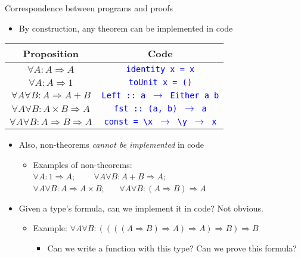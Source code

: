 \documentclass[english]{beamer}
\providecommand{\tabularnewline}{\\}
\begin{document}
\begin{frame}{Correspondence between programs and proofs}

\begin{itemize}
\item By construction, any theorem can be implemented in code
\end{itemize}
\begin{center}
\begin{tabular}{|c|c|}
\hline 
\textbf{Proposition} & \textbf{Code}\tabularnewline
\hline 
\hline 
$\forall A:A\Rightarrow A$ & \texttt{\textcolor{blue}{\footnotesize{}identity x = x}}\tabularnewline
\hline 
$\forall A:A\Rightarrow1$ & \texttt{\textcolor{blue}{\footnotesize{}toUnit x = ()}}\tabularnewline
\hline 
$\forall A\forall B:A\Rightarrow A+B$ & \texttt{\textcolor{blue}{\footnotesize{}Left :: a $\rightarrow$ Either
a b}}\tabularnewline
\hline 
$\forall A\forall B:A\times B\Rightarrow A$ & \texttt{\textcolor{blue}{\footnotesize{}fst :: (a, b) $\rightarrow$
a}}\tabularnewline
\hline 
$\forall A\forall B:A\Rightarrow B\Rightarrow A$ & \texttt{\textcolor{blue}{\footnotesize{}const = \textbackslash{}x
$\rightarrow$ \textbackslash{}y $\rightarrow$ x}}\tabularnewline
\hline 
\end{tabular}
\par\end{center}
\begin{itemize}
\item Also, non-theorems \emph{cannot be implemented} in code 
\begin{itemize}
\item Examples of non-theorems:\\
 $\forall A:1\Rightarrow A$; \  \  $\quad\forall A\forall B:A+B\Rightarrow A$;
\\
$\forall A\forall B:A\Rightarrow A\times B$; \  $\quad\forall A\forall B:(A\Rightarrow B)\Rightarrow A$
\end{itemize}
\item Given a type's formula, can we implement it in code? Not obvious.
\begin{itemize}
\item Example: $\forall A\forall B:((((A\Rightarrow B)\Rightarrow A)\Rightarrow A)\Rightarrow B)\Rightarrow B$
\begin{itemize}
\item Can we write a function with this type? Can we prove this formula?
\end{itemize}
\end{itemize}
\end{itemize}
\end{frame}
\end{document}
